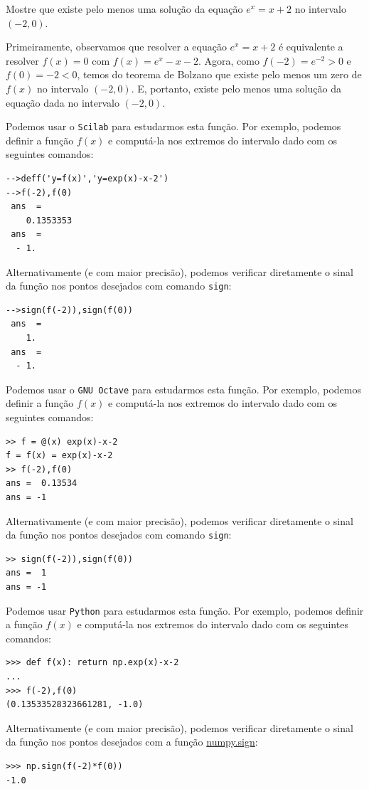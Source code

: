 \begin{ex}\label{ex:teorema_de_Bolzano}
Mostre que existe pelo menos uma solução da equação $e^x=x+2$ no intervalo $(-2,0)$.
\end{ex}
\begin{sol}
Primeiramente, observamos que resolver a equação $e^x = x+2$ é equivalente a resolver $f(x) = 0$ com $f(x)=e^x-x-2$. Agora, como $f(-2)=e^{-2}>0$ e $f(0)=-2<0$, temos do teorema de Bolzano que existe pelo menos um zero de $f(x)$ no intervalo $(-2, 0)$. E, portanto, existe pelo menos uma solução da equação dada no intervalo $(-2, 0)$.

\ifisscilab
Podemos usar o \verb+Scilab+ para estudarmos esta função. Por exemplo, podemos definir a função $f(x)$ e computá-la nos extremos do intervalo dado com os seguintes comandos:
\begin{verbatim}
-->deff('y=f(x)','y=exp(x)-x-2')
-->f(-2),f(0)
 ans  =
    0.1353353  
 ans  =
  - 1.  
\end{verbatim}
Alternativamente (e com maior precisão), podemos verificar diretamente o sinal da função nos pontos desejados com comando \verb+sign+:
\begin{verbatim}
-->sign(f(-2)),sign(f(0))
 ans  =
    1.  
 ans  =
  - 1.  
\end{verbatim}
\fi
\ifisoctave
Podemos usar o \verb+GNU Octave+ para estudarmos esta função. Por exemplo, podemos definir a função $f(x)$ e computá-la nos extremos do intervalo dado com os seguintes comandos:
\begin{verbatim}
>> f = @(x) exp(x)-x-2
f = f(x) = exp(x)-x-2
>> f(-2),f(0)
ans =  0.13534
ans = -1
\end{verbatim}
Alternativamente (e com maior precisão), podemos verificar diretamente o sinal da função nos pontos desejados com comando \verb+sign+:
\begin{verbatim}
>> sign(f(-2)),sign(f(0))
ans =  1
ans = -1
\end{verbatim}
\fi
\ifispython
Podemos usar \verb+Python+ para estudarmos esta função. Por exemplo, podemos definir a função $f(x)$ e computá-la nos extremos do intervalo dado com os seguintes comandos:
\begin{verbatim}
>>> def f(x): return np.exp(x)-x-2
... 
>>> f(-2),f(0)
(0.13533528323661281, -1.0)
\end{verbatim}
Alternativamente (e com maior precisão), podemos verificar diretamente o sinal da função nos pontos desejados com a função \href{https://docs.scipy.org/doc/numpy/reference/generated/numpy.sign.html?highlight=numpy.sign#numpy.sign}{numpy.sign}:
\begin{verbatim}
>>> np.sign(f(-2)*f(0))
-1.0
\end{verbatim}
\fi
\end{sol}


